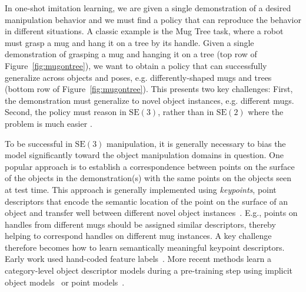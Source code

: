 \documentclass{article}
\begin{document}
In one-shot imitation learning, we are given a single demonstration of a desired manipulation behavior and we must find a policy that can reproduce the behavior in different situations. A classic example is the Mug Tree task, where a robot must grasp a mug and hang it on a tree by its handle. Given a single demonstration of grasping a mug and hanging it on a tree (top row of Figure~\ref{fig:mugontree}), we want to obtain a policy that can successfully generalize across objects and poses, e.g. differently-shaped mugs and trees (bottom row of Figure~\ref{fig:mugontree}). This presents two key challenges: First, the demonstration must generalize to novel object instances, e.g. different mugs. Second, the policy must reason in $\mathrm{SE}(3)$, rather than in $\mathrm{SE}(2)$ where the problem is much easier \cite{wang22so2}. 

To be successful in $\mathrm{SE}(3)$ manipulation, it is generally necessary to bias the model significantly toward the object manipulation domains in question. One popular approach is to establish a correspondence between points on the surface of the objects in the demonstration(s) with the same points on the objects seen at test time. This approach is generally implemented using \emph{keypoints}, point descriptors that encode the semantic location of the point on the surface of an object and transfer well between different novel object instances~\cite{pan22taxpose,wang19dynamic,manuelli19kpam}. E.g., points on handles from different mugs should be assigned similar descriptors, thereby helping to correspond handles on different mug instances. A key challenge therefore becomes how to learn semantically meaningful keypoint descriptors. Early work used hand-coded feature labels~\cite{manuelli19kpam}.
More recent methods learn a category-level object descriptor models during a pre-training step
using implicit object models~\cite{simeonov22neural} or point models~\cite{pan22taxpose}. 


\end{document}
